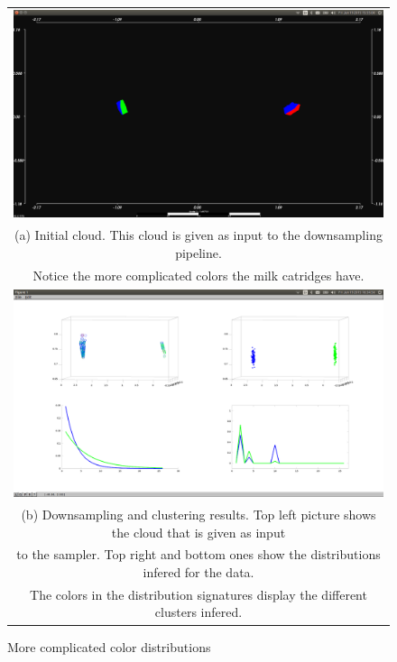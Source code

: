 \documentclass[twoside,hidelinks]{article}
\begin{document}
\begin{figure}
\begin{tabular}{c}
  \includegraphics[width=1\textwidth]{clusterings/coloursSource} \\
  (a) Initial cloud. This cloud is given as input to the downsampling pipeline.    \\
   Notice the more complicated colors the milk catridges have. \\
   \includegraphics[width=1\textwidth]{clusterings/coloursCorrect} \\
 (b) Downsampling and clustering results. Top left picture shows the cloud that is given as input\\
 to the sampler. Top right and bottom ones show the distributions infered for the data. \\
 The colors in the distribution signatures display the different clusters infered.\end{tabular}
\caption{More complicated color distributions}
  \label{pcl:clust2}
\end{figure}
\end{document}
